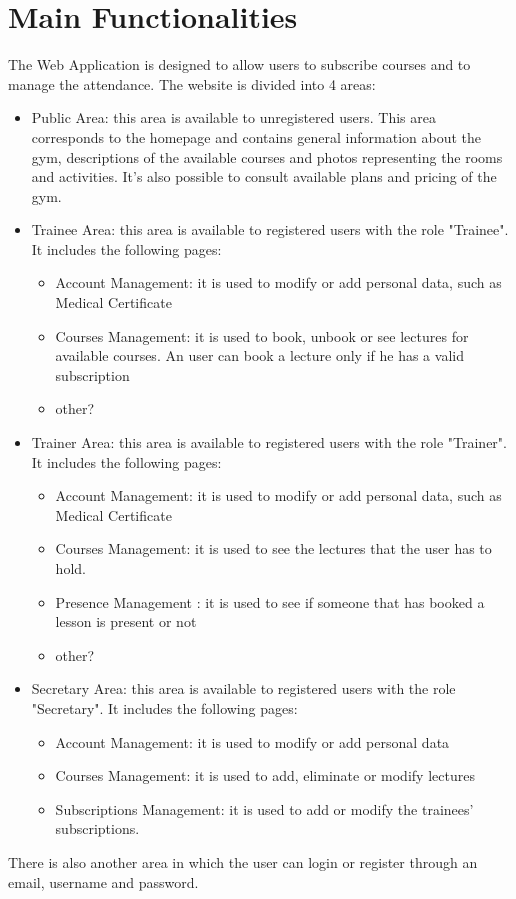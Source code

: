 \section{Main Functionalities}

The Web Application is designed to allow users to subscribe courses and to manage the attendance.
The website is divided into 4 areas:

\begin{itemize}
	\item Public Area: this area is available to unregistered users. This area corresponds to the homepage and contains general information about the gym, descriptions of the available courses and photos representing the rooms and activities. It's also possible to consult available plans and pricing of the gym.
	\item Trainee Area: this area is available to registered users with the role "Trainee". It includes the following pages:
	\begin{itemize}
		\item Account Management: it is used to modify or add personal data, such as Medical Certificate
		\item Courses Management: it is used to book, unbook or see lectures for available courses. An user can book a lecture only if he has a valid subscription
		\item other?
	\end{itemize}
	\item Trainer Area: this area is available to registered users with the role "Trainer". It includes the following pages:
	\begin{itemize}
		\item Account Management: it is used to modify or add personal data, such as Medical Certificate
		\item Courses Management: it is used to see the lectures that the user has to hold.
		\item Presence Management : it is used to see if someone that has booked a lesson is present or not
		\item other?
		
	\end{itemize}
	\item Secretary Area: this area is available to registered users with the role "Secretary".
	It includes the following pages:
	\begin{itemize}
		\item Account Management: it is used to modify or add personal data
		\item Courses Management: it is used to add, eliminate or modify lectures
		\item Subscriptions Management: it is used to add or modify the trainees' subscriptions.
	\end{itemize}
\end{itemize}
There is also another area in which the user can login or register through an email, username and password.\newline
